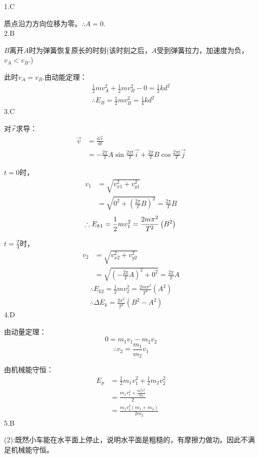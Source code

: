 \documentclass[b5paper,opensource]{./template/qyxf-book}
\newcommand{\di}[1]{\mathrm{d}#1}
\begin{document}
1.C\par
质点沿力方向位移为零。$\therefore A=0$.\\
2.B\par
$B$离开$A$时为弹簧恢复原长的时刻(该时刻之后，$A$受到弹簧拉力，加速度为负，$v_A<v_B$.)\par
此时$v_A=v_B$.由动能定理：
\begin{align*}
\frac{1}{2}mv_A^2+\frac{1}{2}mv_B^2-0=\frac{1}{2}kd^2\\
\therefore{}E_B=\frac{1}{2}mv_B^2=\frac{1}{4}kd^2
\end{align*}
3.C\par
对$\vec{r}$求导：
\begin{align*}
\vec{v}&=\frac{\di{\vec{r}}}{\di{t}}\\
&=-\frac{2\pi}{T}A\sin\frac{2\pi t}{T}\vec{i}+\frac{2\pi}{T}B\cos\frac{2\pi t}{T}\vec{j}
\end{align*}
\par$t=0$时，
\begin{align*}
v_1&=\sqrt{v_{x1}^2+v_{y1}^2}\\
&=\sqrt{0^2+\left(\frac{2\pi}{T}B\right)^2}=\frac{2\pi}{T}B
\end{align*}
\[\therefore{}E_{k1}=\frac{1}{2}mv_1^2=\frac{2m\pi^2}{T^2}\left(B^2\right)\\\]
\par$t=\frac{T}{4}$时，
\begin{align*}
v_2&=\sqrt{v_{x2}^2+v_{y2}^2}\\
&=\sqrt{\left(-\frac{2\pi}{T}A\right)^2+0^2}=\frac{2\pi}{T}A
\end{align*}
\begin{gather*}
\therefore{}E_{k2}=\frac{1}{2}mv_2^2=\frac{2m\pi^2}{T^2}\left(A^2\right)\\
\therefore\Delta{}E_k=\frac{2\pi^2}{T^2}(B^2-A^2)
\end{gather*}
4.D\par
由动量定理：
\[0=m_1v_1-m_2v_2\]
\[\therefore{}v_2=\frac{m_1}{m_2}v_1\]\par
由机械能守恒：
\begin{align*}
E_p &=\frac{1}{2}m_1v_1^2+\frac{1}{2}m_2v_2^2\\
&=\frac{m_1v_1^2+\frac{m_1^2v_1^2}{m_2}}{2}\\
&=\frac{m_1v_1^2\left(m_1+m_2\right)}{2m_2}
\end{align*}
5.B\par
(2):既然小车能在水平面上停止，说明水平面是粗糙的，有摩擦力做功。因此不满足机械能守恒。\par
\end{document}
